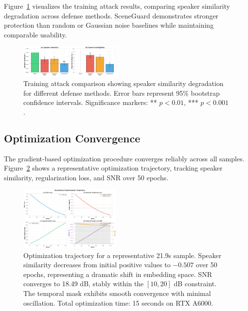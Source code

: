 Figure~\ref{fig:training_attack} visualizes the training attack results, comparing speaker similarity degradation across defense methods. SceneGuard demonstrates stronger protection than random or Gaussian noise baselines while maintaining comparable usability.

\begin{figure}[t]
\centering
\includegraphics[width=0.45\textwidth]{figures/fig2_training_attack.pdf}
\caption{Training attack comparison showing speaker similarity degradation for different defense methods. Error bars represent 95\% bootstrap confidence intervals. Significance markers: ** $p < 0.01$, *** $p < 0.001$.}
\label{fig:training_attack}
\end{figure}

\subsection{Optimization Convergence}

The gradient-based optimization procedure converges reliably across all samples. Figure~\ref{fig:optimization} shows a representative optimization trajectory, tracking speaker similarity, regularization loss, and SNR over 50 epochs.

\begin{figure}[t]
\centering
\includegraphics[width=0.45\textwidth]{figures/optimization_viz/5339_14133_000002_000003_losses.pdf}
\caption{Optimization trajectory for a representative 21.9s sample. Speaker similarity decreases from initial positive values to $-0.507$ over 50 epochs, representing a dramatic shift in embedding space. SNR converges to 18.49 dB, stably within the $[10, 20]$ dB constraint. The temporal mask exhibits smooth convergence with minimal oscillation. Total optimization time: 15 seconds on RTX A6000.}
\label{fig:optimization}
\end{figure}

